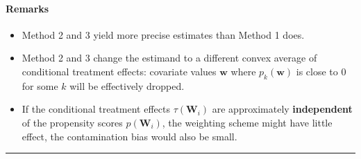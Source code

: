 \documentclass[twoside]{article}
\begin{document}
\paragraph*{Remarks}
\begin{itemize}
    \item Method 2 and 3 yield more precise estimates than Method 1 does.
    \item Method 2 and 3 change the estimand to a different convex average of conditional treatment effects: covariate values $\mathbf{w}$ where $p_k(\mathbf{w})$ is close to 0 for some $k$ will be effectively dropped.
    \item If the conditional treatment effects $\tau(\mathbf{W}_i)$ are approximately \textbf{independent} of the propensity scores $p(\mathbf{W}_i)$, the weighting scheme might have little effect, the contamination bias would also be small.
\end{itemize}

\newpage
\vspace*{20pt}
\noindent\rule{0.995\textwidth}{0.5pt}
\vspace*{-10pt}


\end{document}
